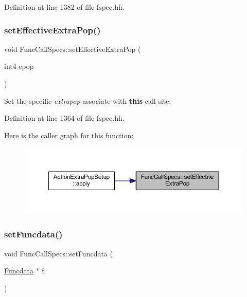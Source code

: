 Definition at line 1382 of file fspec.\+hh.

\mbox{\label{class_func_call_specs_a41d9cc82055fdcbc01f0a37ae3a56a01}} 
\subsubsection{\texorpdfstring{setEffectiveExtraPop()}{setEffectiveExtraPop()}}
{\footnotesize\ttfamily void Func\+Call\+Specs\+::set\+Effective\+Extra\+Pop (\begin{DoxyParamCaption}\item[{int4}]{epop }\end{DoxyParamCaption})\hspace{0.3cm}{\ttfamily [inline]}}



Set the specific {\itshape extrapop} associate with {\bfseries{this}} call site. 



Definition at line 1364 of file fspec.\+hh.

Here is the caller graph for this function\+:
\nopagebreak
\begin{figure}[H]
\begin{center}
\leavevmode
\includegraphics[width=350pt]{class_func_call_specs_a41d9cc82055fdcbc01f0a37ae3a56a01_icgraph}
\end{center}
\end{figure}
\mbox{\label{class_func_call_specs_ae2f63fcf31daa5cc5663df227a813f0a}} 
\subsubsection{\texorpdfstring{setFuncdata()}{setFuncdata()}}
{\footnotesize\ttfamily void Func\+Call\+Specs\+::set\+Funcdata (\begin{DoxyParamCaption}\item[{\mbox{\hyperlink{class_funcdata}{Funcdata}} $\ast$}]{f }\end{DoxyParamCaption})}



